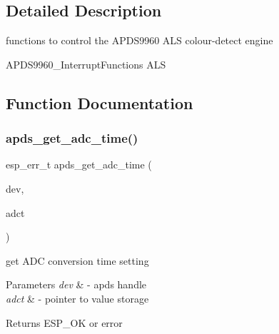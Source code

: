 \subsection{Detailed Description}
functions to control the A\+P\+D\+S9960 A\+LS colour-\/detect engine 

A\+P\+D\+S9960\+\_\+\+Interrupt\+Functions A\+LS 

\subsection{Function Documentation}
\mbox{\label{group__APDS9960__ALSFunctions_ga0fc20a4645aa31c7416fa12d0514d8f0}} 
\subsubsection{\texorpdfstring{apds\+\_\+get\+\_\+adc\+\_\+time()}{apds\_get\_adc\_time()}}
{\footnotesize\ttfamily esp\+\_\+err\+\_\+t apds\+\_\+get\+\_\+adc\+\_\+time (\begin{DoxyParamCaption}\item[{\hyperlink{structAPDS9960__Driver}{A\+P\+D\+S\+\_\+\+D\+EV}}]{dev,  }\item[{\hyperlink{vl53l0x__types_8h_aba7bc1797add20fe3efdf37ced1182c5}{uint8\+\_\+t} $\ast$}]{adct }\end{DoxyParamCaption})}




\begin{DoxyItemize}
\item get A\+DC conversion time setting 
\end{DoxyItemize}


\begin{DoxyParams}{Parameters}
{\em dev} & -\/ apds handle \\
\hline
{\em adct} & -\/ pointer to value storage \\
\hline
\end{DoxyParams}
\begin{DoxyReturn}{Returns}
E\+S\+P\+\_\+\+OK or error 
\end{DoxyReturn}
\mbox{\label{group__APDS9960__ALSFunctions_ga7e50d65cb6156191e03906ccc44e348e}} 
